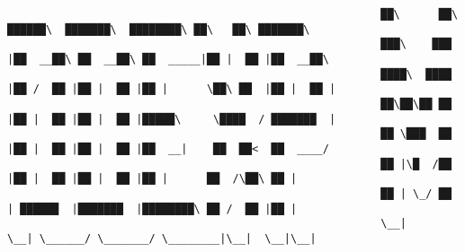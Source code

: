 \documentclass[varwidth=\maxdimen,margin=0.5cm,multi={verbatim}]{standalone}
\begin{document}
\begin{verbatim}
                                                          ██\      ██\  ██████\  ███████\  ████████\ ██\   ██\ ███████\  
                                                          ███\    ███ |██  __██\ ██  __██\ ██  _____|██ |  ██ |██  __██\ 
                                                          ████\  ████ |██ /  ██ |██ |  ██ |██ |      \██\ ██  |██ |  ██ |
                                                          ██\██\██ ██ |██ |  ██ |██ |  ██ |█████\     \████  / ███████  |
                                                          ██ \███  ██ |██ |  ██ |██ |  ██ |██  __|    ██  ██<  ██  ____/ 
                                                          ██ |\█  /██ |██ |  ██ |██ |  ██ |██ |      ██  /\██\ ██ |      
                                                          ██ | \_/ ██ | ██████  |███████  |████████\ ██ /  ██ |██ |      
                                                          \__|     \__| \______/ \_______/ \________|\__|  \__|\__|




\end{verbatim}
\end{document}
